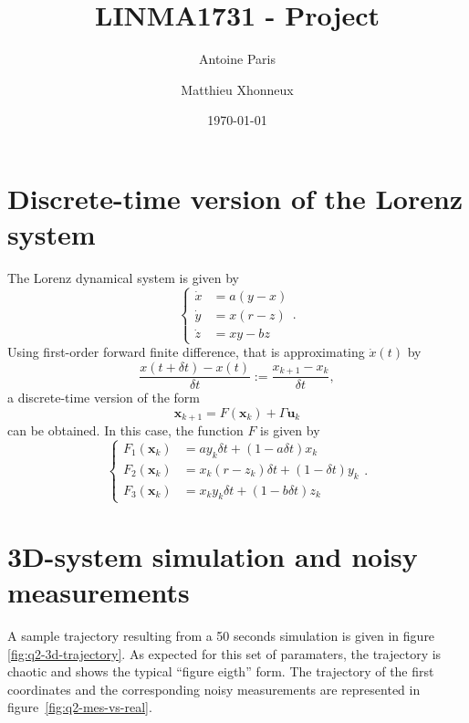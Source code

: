 \documentclass[english, DIV=13]{scrartcl}
\title{LINMA1731 - Project}
\author{Antoine Paris\and Matthieu Xhonneux}
\date{\today}
\renewcommand{\vec}[1]{\mathbf{#1}}
\begin{document}
\maketitle

\section{Discrete-time version of the Lorenz system}
The Lorenz dynamical system is given by
\begin{equation*}
    \begin{cases}
        \dot{x} &= a(y-x) \\
        \dot{y} &= x(r-z) \\
        \dot{z} &= xy - bz
    \end{cases}.
\end{equation*}
Using first-order forward finite difference, that is approximating $\dot{x}(t)$ by
\[ \frac{x(t+\delta t) - x(t)}{\delta t} := \frac{x_{k+1} - x_k}{\delta t}, \]
a discrete-time version of the form
\[ \vec{x}_{k+1} = F(\vec{x}_k) + \Gamma\vec{u}_k \]
can be obtained. In this case, the function $F$ is given by
\begin{equation*}
    \begin{cases}
        F_1(\vec{x}_k) &= ay_k\delta t + (1-a\delta t)x_k \\
        F_2(\vec{x}_k) &= x_k(r-z_k)\delta t + (1-\delta t)y_k \\
        F_3(\vec{x}_k) &= x_ky_k\delta t + (1-b\delta t)z_k
    \end{cases}.
\end{equation*}

\section{3D-system simulation and noisy measurements}
A sample trajectory resulting from a 50 seconds simulation is given in figure~
\ref{fig:q2-3d-trajectory}. As expected for this set of paramaters, the trajectory
is chaotic and shows the typical ``figure eigth'' form. 
The trajectory of the first coordinates and the corresponding noisy measurements
are represented in figure~\ref{fig:q2-mes-vs-real}.
\end{document}
